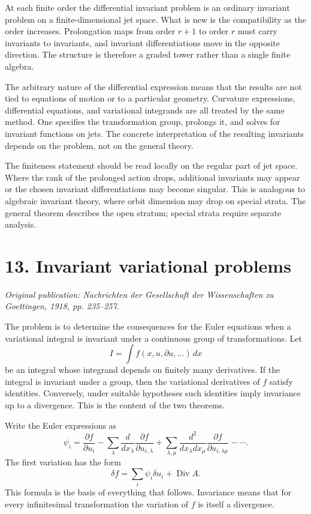 \documentclass[11pt]{article}
\begin{document}
At each finite order the differential invariant problem is an ordinary invariant problem on a
finite-dimensional jet space. What is new is the compatibility as the order increases. Prolongation
maps from order \(r+1\) to order \(r\) must carry invariants to invariants, and invariant
differentiations move in the opposite direction. The structure is therefore a graded tower rather
than a single finite algebra.

The arbitrary nature of the differential expression means that the results are not tied to equations
of motion or to a particular geometry. Curvature expressions, differential equations, and
variational integrands are all treated by the same method. One specifies the transformation group,
prolongs it, and solves for invariant functions on jets. The concrete interpretation of the
resulting invariants depends on the problem, not on the general theory.

The finiteness statement should be read locally on the regular part of jet space. Where the rank of
the prolonged action drops, additional invariants may appear or the chosen invariant
differentiations may become singular. This is analogous to algebraic invariant theory, where orbit
dimension may drop on special strata. The general theorem describes the open stratum; special strata
require separate analysis.


\section{13. Invariant variational problems}

\textit{Original publication: Nachrichten der Gesellschaft der Wissenschaften zu Goettingen, 1918, pp. 235--257.}

The problem is to determine the consequences for the Euler equations when a variational integral is
invariant under a continuous group of transformations. Let \[   I=\int f(x,u,\partial u,\ldots)\,dx
\] be an integral whose integrand depends on finitely many derivatives. If the integral is invariant
under a group, then the variational derivatives of \(f\) satisfy identities. Conversely, under
suitable hypotheses such identities imply invariance up to a divergence. This is the content of the
two theorems.


Write the Euler expressions as \[   \psi_i=\frac{\partial f}{\partial u_i}   -\sum_\lambda
\frac{d}{dx_\lambda}\frac{\partial f}{\partial u_{i,\lambda}}
+\sum_{\lambda,\mu}\frac{d^2}{dx_\lambda dx_\mu}        \frac{\partial f}{\partial
u_{i,\lambda\mu}}-\cdots . \] The first variation has the form \[   \delta f=\sum_i \psi_i\delta
u_i+\operatorname{Div} A. \] This formula is the basis of everything that follows. Invariance means
that for every infinitesimal transformation the variation of \(f\) is itself a divergence.
\end{document}
